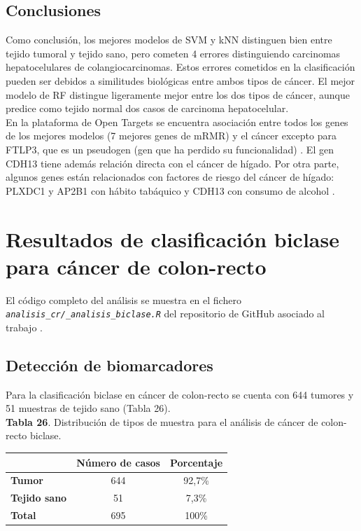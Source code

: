 \subsection{Conclusiones}

Como conclusión, los mejores modelos de SVM y kNN distinguen bien entre tejido tumoral y tejido sano, pero cometen 4 errores distinguiendo carcinomas hepatocelulares de colangiocarcinomas. Estos errores cometidos en la clasificación pueden ser debidos a similitudes biológicas entre ambos tipos de cáncer. El mejor modelo de RF distingue ligeramente mejor entre los dos tipos de cáncer, aunque predice como tejido normal dos casos de carcinoma hepatocelular.\\

En la plataforma de Open Targets \cite{OpenTargets2020} se encuentra asociación entre todos los genes de los mejores modelos (7 mejores genes de mRMR) y el cáncer excepto para FTLP3, que es un pseudogen (gen que ha perdido su funcionalidad) \cite{Guo2014}. El gen CDH13 tiene además relación directa con el cáncer de hígado. Por otra parte, algunos genes están relacionados con factores de riesgo del cáncer de hígado: PLXDC1 y AP2B1 con hábito tabáquico \cite{Liu2019} y CDH13 con consumo de alcohol \cite{Schumann2016}.

\section{Resultados de clasificación biclase para cáncer de colon-recto}

El código completo del análisis se muestra en el fichero \textit{\texttt{analisis\_cr/\_analisis\_biclase.R}} del repositorio de GitHub asociado al trabajo \cite{Redondo-Sanchez2020}.

\subsection{Detección de biomarcadores}

Para la clasificación biclase en cáncer de colon-recto se cuenta con 644 tumores y 51 muestras de tejido sano (Tabla 26).\\

\textbf{Tabla 26}. Distribución de tipos de muestra para el análisis de cáncer de colon-recto biclase.

\begin{table}[H]
	\centering
	\begin{tabular}{lcc}
		\cline{2-3}
		& \textbf{Número de casos} & \textbf{Porcentaje} \\ \hline
		\textbf{Tumor}     & 644        & 92,7\%              \\
		\textbf{Tejido sano} & 51         & 7,3\%              \\ \hline
		\textbf{Total}       & 695        & 100\%               \\ \hline
	\end{tabular}
\end{table}

